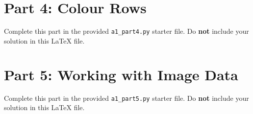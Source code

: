\section*{Part 4: Colour Rows}

Complete this part in the provided \texttt{a1\_part4.py} starter file.
Do \textbf{not} include your solution in this LaTeX file.

\section*{Part 5: Working with Image Data}

Complete this part in the provided \texttt{a1\_part5.py} starter file.
Do \textbf{not} include your solution in this LaTeX file.


